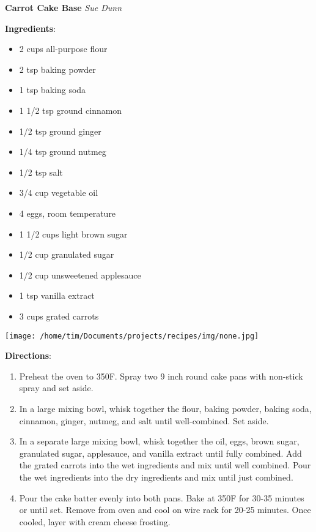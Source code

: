 \documentclass[11pt, twoside, openany]{book}
\begin{document}
\noindent\begin{minipage}[t]{\linewidth}%
{\Large\textbf{Carrot Cake Base}} \label{carrot-cake-base}\hfill\textit{Sue Dunn}\\
\noindent\begin{minipage}[t]{0.78\linewidth}%
\textbf{Ingredients}:\vspace{-3mm}
\begin{multicols}{2}
\begin{itemize}\setlength\itemsep{-1mm}
\item 2 cups all-purpose flour
\item 2 tsp baking powder
\item 1 tsp baking soda
\item 1 1/2 tsp ground cinnamon
\item 1/2 tsp ground ginger
\item 1/4 tsp ground nutmeg
\item 1/2 tsp salt
\item 3/4 cup vegetable oil
\item 4 eggs, room temperature
\item 1 1/2 cups light brown sugar
\item 1/2 cup granulated sugar
\item 1/2 cup unsweetened applesauce
\item 1 tsp vanilla extract
\item 3 cups grated carrots
\end{itemize}
\end{multicols}
\end{minipage}
\noindent\begin{minipage}[t]{0.18\linewidth}
\centering \strut\vspace*{-\baselineskip}\newline
\texttt{[image: /home/tim/Documents/projects/recipes/img/none.jpg]}\\
\end{minipage}\vspace{3mm}
\textbf{Directions}:
\vspace{-3mm}\begin{enumerate}\setlength\itemsep{-1mm}
\item Preheat the oven to 350F. Spray two 9 inch round cake pans with non-stick spray and set aside.
\item In a large mixing bowl, whisk together the flour, baking powder, baking soda, cinnamon, ginger, nutmeg, and salt until well-combined. Set aside.
\item In a separate large mixing bowl, whisk together the oil, eggs, brown sugar, granulated sugar, applesauce, and vanilla extract until fully combined. Add the grated carrots into the wet ingredients and mix until well combined. Pour the wet ingredients into the dry ingredients and mix until just combined.
\item Pour the cake batter evenly into both pans. Bake at 350F for 30-35 minutes or until set. Remove from oven and cool on wire rack for 20-25 minutes. Once cooled, layer with cream cheese frosting.
\end{enumerate}
\end{minipage}\vspace{8mm}
\end{document}
